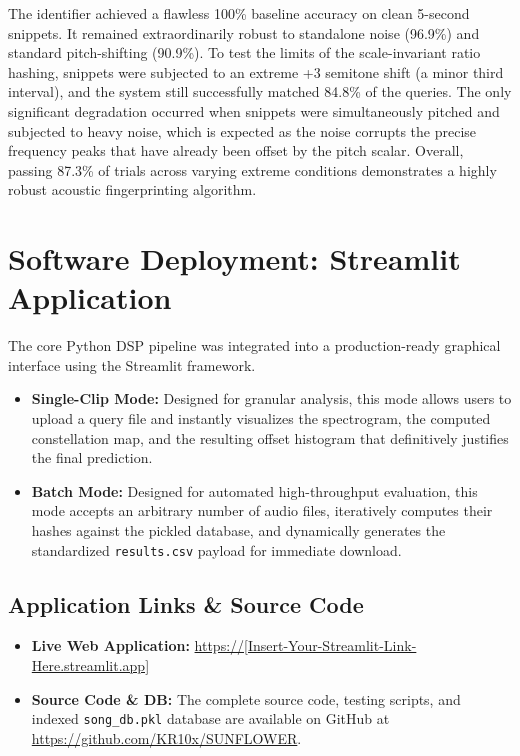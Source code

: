 \documentclass[11pt, a4paper]{article}
\begin{document}
The identifier achieved a flawless 100\% baseline accuracy on clean 5-second snippets. It remained extraordinarily robust to standalone noise (96.9\%) and standard pitch-shifting (90.9\%). To test the limits of the scale-invariant ratio hashing, snippets were subjected to an extreme +3 semitone shift (a minor third interval), and the system still successfully matched 84.8\% of the queries. The only significant degradation occurred when snippets were simultaneously pitched and subjected to heavy noise, which is expected as the noise corrupts the precise frequency peaks that have already been offset by the pitch scalar. Overall, passing 87.3\% of trials across varying extreme conditions demonstrates a highly robust acoustic fingerprinting algorithm.

\section{Software Deployment: Streamlit Application}
The core Python DSP pipeline was integrated into a production-ready graphical interface using the Streamlit framework. 

\begin{itemize}
    \item \textbf{Single-Clip Mode:} Designed for granular analysis, this mode allows users to upload a query file and instantly visualizes the spectrogram, the computed constellation map, and the resulting offset histogram that definitively justifies the final prediction.
    \item \textbf{Batch Mode:} Designed for automated high-throughput evaluation, this mode accepts an arbitrary number of audio files, iteratively computes their hashes against the pickled database, and dynamically generates the standardized \texttt{results.csv} payload for immediate download.
\end{itemize}

\subsection*{Application Links \& Source Code}
\begin{itemize}
    \item \textbf{Live Web Application:} \url{https://[Insert-Your-Streamlit-Link-Here.streamlit.app]} 
    \item \textbf{Source Code \& DB:} The complete source code, testing scripts, and indexed \texttt{song\_db.pkl} database are available on GitHub at \url{https://github.com/KR10x/SUNFLOWER}.
\end{itemize}
\end{document}
